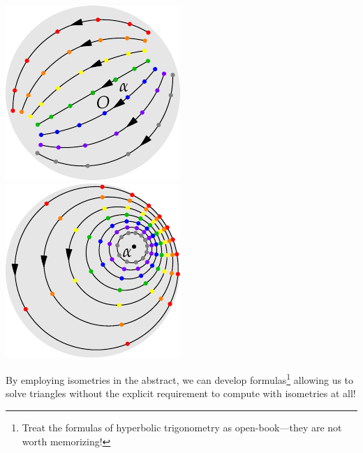 \begin{minipage}[t]{0.24\linewidth}\vspace{-3pt}
	\flushright\includegraphics[scale=0.95]{isom-trans}\\
	\includegraphics[scale=0.95]{isom-rotate}
\end{minipage}

\goodbreak




By employing isometries in the abstract, we can develop formulas\footnote{Treat the formulas of hyperbolic trigonometry as open-book---they are not worth memorizing!} allowing us to solve triangles without the explicit requirement to compute with isometries at all!


\smallbreak

